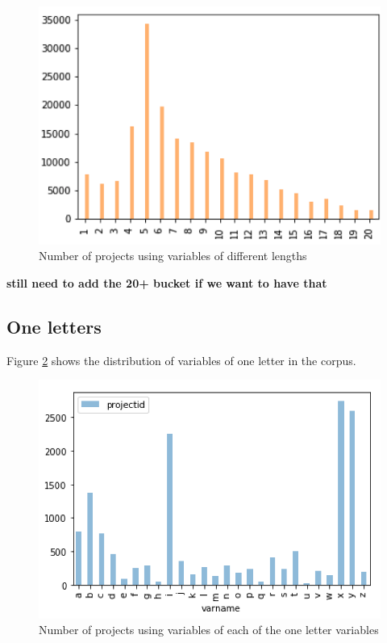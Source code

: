\documentclass[conference]{IEEEtran}
\newcommand{\todo}[1]{ \textbf{#1} }
\begin{document}
\begin{figure}[h]
	\begin{center}
		\includegraphics[width=\columnwidth]{fig/distribution_of_lengths}
		\caption{Number of projects using variables of different lengths}
		\label{fig:distribution_of_lengths}
	\end{center}
\end{figure} 

\todo{still need to add the 20+ bucket if we want to have that}

\subsection{One letters}

Figure \ref{fig:one_letter_occurrence} shows the distribution of variables of one letter in the corpus.

\begin{figure}[h]
	\begin{center}
		\includegraphics[width=\columnwidth]{fig/one_letter_occurrence}
		\caption{Number of projects using variables of each of the one letter variables}
		\label{fig:one_letter_occurrence}
	\end{center}
\end{figure} 
\end{document}
